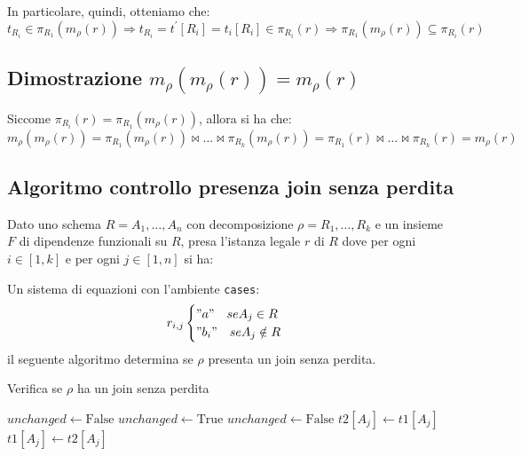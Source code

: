 \documentclass{article}
\begin{document}
In particolare, quindi, otteniamo che:
\[ t_{R_i} \in \pi_{R_1}(m_{\rho}(r)) \Rightarrow t_{R_i} = t^{'}[R_i] = t_i[R_i] \in \pi_{R_i}(r) \Rightarrow \pi_{R_1}(m_{\rho}(r)) \subseteq \pi_{R_i}(r) \]

\subsection{Dimostrazione $m_{\rho}(m_{\rho}(r)) = m_{\rho}(r)$}
Siccome $\pi_{R_i}(r) = \pi_{R_1}(m_{\rho}(r))$, allora si ha che:
\[ m_{\rho}(m_{\rho}(r)) = \pi_{R_1}(m_{\rho}(r)) \bowtie \ldots \bowtie \pi_{R_k}(m_{\rho}(r)) = \pi_{R_1}(r) \bowtie \ldots \bowtie \pi_{R_k}(r) = m_{\rho}(r) \]

\pagebreak

\subsection{Algoritmo controllo presenza join senza perdita}
Dato uno schema $R = A_1, \ldots, A_n$ con decomposizione $\rho = R_1, \ldots, R_k$ e un insieme $F$ di dipendenze funzionali su $R$, presa l'istanza legale $r$ di $R$ dove per ogni $i \in [1, k]$ e per ogni $j \in [1, n]$ si ha:


Un sistema di equazioni con l'ambiente \texttt{cases}:
\[r_{i, j}
\begin{cases}
    "a" \quad se A_j \in R \\
    "b_i" \quad se A_j \notin R
\end{cases}
\]
il seguente algoritmo determina se $\rho$ presenta un join senza perdita.
\begin{algorithm}
  \caption{Verifica se $\rho$ ha un join senza perdita}
  \begin{algorithmic}[1]
          \State $unchanged \gets \text{False}$
              \State $unchanged \gets \text{True}$
                              \State $unchanged \gets \text{False}$
                                      \State $t2[A_j] \gets t1[A_j]$
                                  \Else
                                      \State $t1[A_j] \gets t2[A_j]$
                               
                  \State \Return {}
              \EndIf
          \EndFor
          \State \Return {}
      \EndFunction
  \end{algorithmic}
\end{algorithm}
\end{document}
